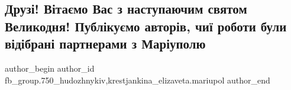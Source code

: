  
 
 
 
 

\subsection{Друзі! Вітаємо Вас з наступаючим святом Великодня! Публікуємо авторів, чиї роботи були відібрані партнерами з Маріуполю}
\label{sec:26_04_2019.fb.fb_group.750_hudozhnykiv.1.avtory_pysanky_zajci}
 
\ifcmt
 author_begin
   author_id fb_group.750_hudozhnykiv,krestjankina_elizaveta.mariupol
 author_end
\fi
